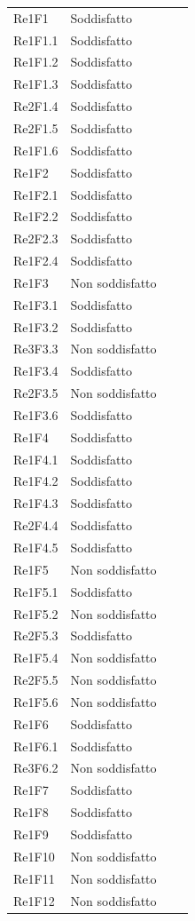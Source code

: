 \begin{longtable}{C{3cm} C{3cm} L{5.5cm} C{3cm}}
Re1F1 	& Soddisfatto\\
Re1F1.1 & Soddisfatto\\
Re1F1.2 & Soddisfatto\\
Re1F1.3 & Soddisfatto\\
Re2F1.4 & Soddisfatto\\
Re2F1.5 & Soddisfatto\\
Re1F1.6 & Soddisfatto\\
Re1F2 	& Soddisfatto\\
Re1F2.1 & Soddisfatto\\
Re1F2.2 & Soddisfatto\\
Re2F2.3 & Soddisfatto\\
Re1F2.4 & Soddisfatto\\
Re1F3 	& Non soddisfatto\\
Re1F3.1 & Soddisfatto\\
Re1F3.2 & Soddisfatto\\
Re3F3.3 & Non soddisfatto\\ 
Re1F3.4 & Soddisfatto\\
Re2F3.5 & Non soddisfatto\\
Re1F3.6 & Soddisfatto\\
Re1F4 	& Soddisfatto\\
Re1F4.1 & Soddisfatto\\
Re1F4.2 & Soddisfatto\\
Re1F4.3 & Soddisfatto\\
Re2F4.4 & Soddisfatto\\
Re1F4.5 & Soddisfatto\\
Re1F5 	& Non soddisfatto\\
Re1F5.1 & Soddisfatto\\
Re1F5.2 & Non soddisfatto\\
Re2F5.3 & Soddisfatto\\
Re1F5.4 & Non soddisfatto\\
Re2F5.5 & Non soddisfatto\\
Re1F5.6 & Non soddisfatto\\
Re1F6 	& Soddisfatto\\
Re1F6.1 & Soddisfatto\\
Re3F6.2 & Non soddisfatto\\
Re1F7 	& Soddisfatto\\
Re1F8 	& Soddisfatto\\
Re1F9 	& Soddisfatto\\
Re1F10 	& Non soddisfatto\\
Re1F11 	& Non soddisfatto\\
Re1F12 	& Non soddisfatto\\

\end{longtable}
